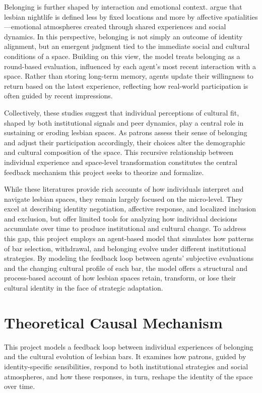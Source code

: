 \documentclass{article}
\begin{document}
Belonging is further shaped by interaction and emotional context. \citet{baxter2024} argue that lesbian nightlife is defined less by fixed locations and more by affective spatialities—emotional atmospheres created through shared experiences and social dynamics. In this perspective, belonging is not simply an outcome of identity alignment, but an emergent judgment tied to the immediate social and cultural conditions of a space. Building on this view, the model treats belonging as a round-based evaluation, influenced by each agent’s most recent interaction with a space. Rather than storing long-term memory, agents update their willingness to return based on the latest experience, reflecting how real-world participation is often guided by recent impressions.

Collectively, these studies suggest that individual perceptions of cultural fit, shaped by both institutional signals and peer dynamics, play a central role in sustaining or eroding lesbian spaces. As patrons assess their sense of belonging and adjust their participation accordingly, their choices alter the demographic and cultural composition of the space. This recursive relationship between individual experience and space-level transformation constitutes the central feedback mechanism this project seeks to theorize and formalize.

While these literatures provide rich accounts of how individuals interpret and navigate lesbian spaces, they remain largely focused on the micro-level. They excel at describing identity negotiation, affective response, and localized inclusion and exclusion, but offer limited tools for analyzing how individual decisions accumulate over time to produce institutional and cultural change. To address this gap, this project employs an agent-based model that simulates how patterns of bar selection, withdrawal, and belonging evolve under different institutional strategies. By modeling the feedback loop between agents’ subjective evaluations and the changing cultural profile of each bar, the model offers a structural and process-based account of how lesbian spaces retain, transform, or lose their cultural identity in the face of strategic adaptation.

\section*{Theoretical Causal Mechanism}

This project models a feedback loop between individual experiences of belonging and the cultural evolution of lesbian bars. It examines how patrons, guided by identity-specific sensibilities, respond to both institutional strategies and social atmospheres, and how these responses, in turn, reshape the identity of the space over time.
\end{document}

